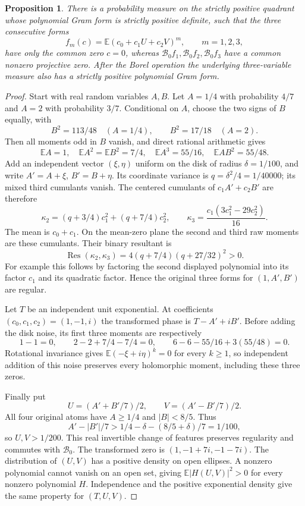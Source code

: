 \documentclass[11pt]{article}
\newtheorem{proposition}{Proposition}
\begin{document}
\begin{proposition}\label{prop:positive-moment-borel-obstruction}
There is a probability measure on the strictly positive quadrant
whose polynomial Gram form is strictly positive definite, such that
the three consecutive forms
\[
 f_m(c)=\mathbb E(c_0+c_1U+c_2V)^m,\qquad m=1,2,3,
\]
have only the common zero $c=0$, whereas
$\mathcal B_0 f_1,\mathcal B_0 f_2,\mathcal B_0 f_3$ have a common
nonzero projective zero. After the Borel operation the underlying
three-variable measure also has a strictly positive polynomial Gram form.
\end{proposition}
\begin{proof}
Start with real random variables $A,B$. Let $A=1/4$ with probability
$4/7$ and $A=2$ with probability $3/7$. Conditional on $A$, choose
the two signs of $B$ equally, with
\[
 B^2=113/48\quad(A=1/4),\qquad
 B^2=17/18\quad(A=2).
\]
Then all moments odd in $B$ vanish, and direct rational arithmetic gives
\[
 \mathbb EA=1,\quad
 \mathbb EA^2=\mathbb EB^2=7/4,\quad
 \mathbb EA^3=55/16,\quad \mathbb EAB^2=55/48.
\]
Add an independent vector $(\xi,\eta)$ uniform on the disk of radius
$\delta=1/100$, and write $A'=A+\xi$, $B'=B+\eta$.
Its coordinate variance is $q=\delta^2/4=1/40000$;
its mixed third cumulants vanish. The centered cumulants of
$c_1A'+c_2B'$ are therefore
\[
 \kappa_2=(q+3/4)c_1^2+(q+7/4)c_2^2,\qquad
 \kappa_3=\frac{c_1(3c_1^2-29c_2^2)}{16}.
\]
The mean is $c_0+c_1$. On the mean-zero plane the second and third
raw moments are these cumulants. Their binary resultant is
\[
 \operatorname{Res}(\kappa_2,\kappa_3)
   =4(q+7/4)(q+27/32)^2>0.
\]
For example this follows by factoring the second displayed polynomial
into its factor $c_1$ and its quadratic factor. Hence the original
three forms for $(1,A',B')$ are regular.

Let $T$ be an independent unit exponential. At coefficients
$(c_0,c_1,c_2)=(1,-1,i)$ the transformed phase is $T-A'+iB'$.
Before adding the disk noise, its first three moments are respectively
\[
 1-1=0,\qquad
 2-2+7/4-7/4=0,\qquad
 6-6-55/16+3(55/48)=0.
\]
Rotational invariance gives $\mathbb E(-\xi+i\eta)^k=0$ for
every $k\ge1$, so independent addition of this noise preserves every
holomorphic moment, including these three zeros.

Finally put
\[
 U=(A'+B'/7)/2,\qquad V=(A'-B'/7)/2.
\]
All four original atoms have $A\ge1/4$ and $|B|<8/5$. Thus
\[
 A'-|B'|/7>1/4-\delta-(8/5+\delta)/7=1/100,
\]
so $U,V>1/200$. This real invertible change of features preserves
regularity and commutes with $\mathcal B_0$. The transformed zero
is $(1,-1+7i,-1-7i)$. The distribution of $(U,V)$ has a positive
density on open ellipses. A nonzero polynomial cannot vanish on an
open set, giving $\mathbb E|H(U,V)|^2>0$ for every nonzero polynomial
$H$. Independence and the positive exponential density give the same
property for $(T,U,V)$.
\end{proof}
\end{document}
